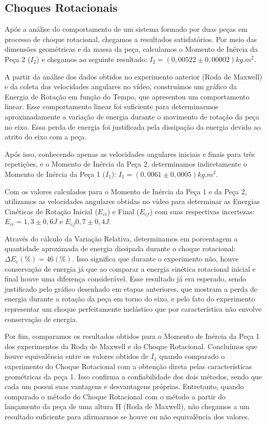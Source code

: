 
\subsection{Choques Rotacionais}

Após a análise do comportamento de um sistema formado por duas peças em processo de choque rotacional, chegamos a resultados satisfatórios. Por meio das dimensões geométricas e da massa da peça, calculamos o Momento de Inércia da Peça 2 ($I_2$) e chegamos ao seguinte resultado: $I_2 = (0,00522 \pm 0,00002) kg.m^2$.

A partir da análise dos dados obtidos no experimento anterior (Roda de Maxwell) e da coleta das velocidades angulares no vídeo, construímos um gráfico da Energia de Rotação em função do Tempo, que apresentou um comportamento linear. Esse comportamento linear foi suficiente para determinarmos aproximadamente a variação de energia durante o movimento de rotação da peça no eixo. Essa perda de energia foi justificada pela dissipação da energia devido ao atrito do eixo com a peça.

Após isso, conhecendo apenas as velocidades angulares iniciais e finais para três repetições, e o Momento de Inércia da Peça 2, determinamos indiretamente o Momento de Inércia da Peça 1 ($I_1$): $I_1 = (0,0061 \pm 0,0005) kg.m^2$.

Com os valores calculados para o Momento de Inércia da Peça 1 e da Peça 2, utilizamos as velocidades angulares obtidas no vídeo para determinar as Energias Cinéticas de Rotação Inicial ($E_{ci}$) e Final ($E_{cf}$) com suas respectivas incertezas: $E_{ci} = 1,3 \pm 0,6 J$ e $E_{cf}0,7 \pm 0,4 J$. 

Através do cálculo da Variação Relativa, determinamos em porcentagem a quantidade aproximada de energia dissipada durante o choque rotacional: $\Delta E_c (\%) = 46 (\%)$. Isso significa que durante o experimento não, houve conservação de energia já que ao comparar a energia cinética rotacional inicial e final houve uma diferença considerável. Esse resultado já era esperado, sendo justificado pelo gráfico desenhado em etapas anteriores, que mostram a perda de energia durante a rotação da peça em torno do eixo, e pelo fato do experimento representar um choque perfeitamente inelástico que por característica não envolve conservação de energia.

Por fim, comparamos os resultados obtidos para o Momento de Inércia da Peça 1 dos experimentos da Roda de Maxwell e do Choque Rotacional. Concluímos que houve equivalência entre os valores obtidos de $I_1$ quando comparado o experimento do Choque Rotacional com a obtenção direta pelas características geométricas da peça 1. Isso confirma a confiabilidade dos dois métodos, sendo que cada um possui suas vantagens e desvantagens próprias. Entretanto, quando comparado o método do Choque Rotacional com o método a partir do lançamento da peça de uma altura H (Roda de Maxwell), não chegamos a um resultado suficiente para afirmarmos se houve ou não equivalência dos valores.

